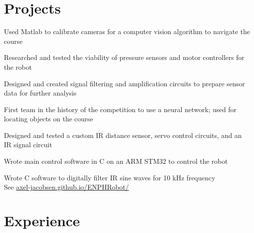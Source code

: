 \documentclass[]{deedy-resume-openfont}
\begin{document}

	\section{Projects}
	\begin{tightemize}
		\item Used Matlab to calibrate cameras for a computer vision algorithm to navigate the course
		\item Researched and tested the viability of pressure sensors and motor controllers for the robot
		\item Designed and created signal filtering and amplification circuits to prepare sensor data for further analysis
	\end{tightemize}
	\vspace{8pt}
	
	\begin{tightemize}
		\item First team in the history of the competition to use a neural network; used for locating objects on the course
		\item Designed and tested a custom IR distance sensor, servo control circuits, and an IR signal circuit
		\item Wrote main control software in C on an ARM STM32 to control the robot
		\item Wrote C software to digitally filter IR sine waves for 10 kHz frequency \\
		See \href{https://axel-jacobsen.github.io/ENPHRobot/}{axel-jacobsen.github.io/ENPHRobot/}
	\end{tightemize}
	\vspace{10pt}
	
	\section{Experience}
	
\end{document}
